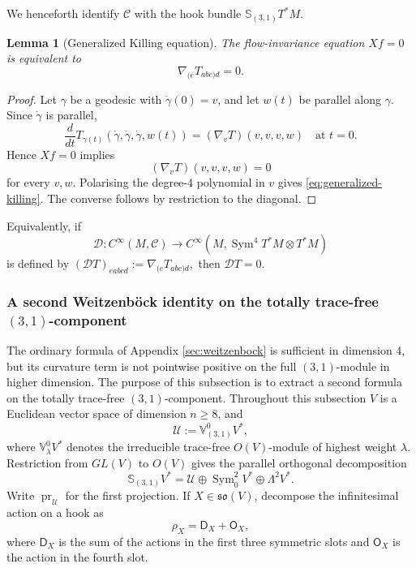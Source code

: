\documentclass[reqno,11pt]{amsart}
\newtheorem{lemma}[theorem]{Lemma}
\theoremstyle{definition}
\newcommand{\cC}{\mathcal C}
\newcommand{\Sym}{\operatorname{Sym}}
\newcommand{\cD}{\mathcal D}
\newcommand{\cU}{\mathcal U}
\newcommand{\Hook}{\mathbb S_{(3,1)}}
\begin{document}
We henceforth identify $\cC$ with the hook bundle $\Hook T^*M$.

\begin{lemma}[Generalized Killing equation]\label{lem:killing-equation}
The flow-invariance equation $Xf=0$ is equivalent to
\begin{equation}\label{eq:generalized-killing}
  \nabla_{(e}T_{abc)d}=0.
\end{equation}
\end{lemma}

\begin{proof}
Let $\gamma$ be a geodesic with $\dot\gamma(0)=v$, and let $w(t)$ be parallel
along $\gamma$. Since $\dot\gamma$ is parallel,
$$
  \frac{d}{dt}
  T_{\gamma(t)}(\dot\gamma,\dot\gamma,\dot\gamma,w(t))
  =(\nabla_vT)(v,v,v,w)
\quad\text{at }t=0.
$$
Hence $Xf=0$ implies
$$
  (\nabla_vT)(v,v,v,w)=0
$$
for every $v,w$. Polarising the degree-$4$ polynomial in $v$ gives
\eqref{eq:generalized-killing}. The converse follows by restriction to the diagonal.
\end{proof}

Equivalently, if
$$
  \cD:C^\infty(M,\cC)
  \longrightarrow C^\infty(M,\Sym^4T^*M\otimes T^*M)
$$
is defined by
$
  (\cD T)_{eabcd}:=\nabla_{(e}T_{abc)d},
$
then $\cD T=0$.
\subsubsection{A second Weitzenb\"ock identity on the totally trace-free \texorpdfstring{$(3,1)$}{(3,1)}-component}\label{sec:tracefree-hook-weitzenbock}

The ordinary formula of Appendix \ref{sec:weitzenbock} is sufficient in dimension
$4$, but its curvature term is not pointwise positive on the full
$(3,1)$-module in higher dimension.  The purpose of this subsection is to
extract a second formula on the totally trace-free $(3,1)$-component.  Throughout this
subsection $V$ is a Euclidean vector space of dimension $n\geq8$, and
$$
  \cU:=\mathbb V^0_{(3,1)}V^*,
$$
where $\mathbb V^0_\lambda V^*$ denotes the irreducible trace-free
$O(V)$-module of highest weight $\lambda$. Restriction from $GL(V)$ to
$O(V)$ gives the parallel orthogonal
decomposition
\begin{equation}\label{eq:orthogonal-hook-decomposition}
  \Hook V^*
  =\cU\oplus\Sym^2_0V^*\oplus\Lambda^2V^*.
\end{equation}
Write $\operatorname{pr}_{\cU}$ for the first projection. If
$X\in\mathfrak{so}(V)$, decompose the infinitesimal action on a hook as
$$
  \rho_X=\mathsf D_X+\mathsf O_X,
$$
where $\mathsf D_X$ is the sum of the actions in the first three symmetric
slots and $\mathsf O_X$ is the action in the fourth slot.
\end{document}
